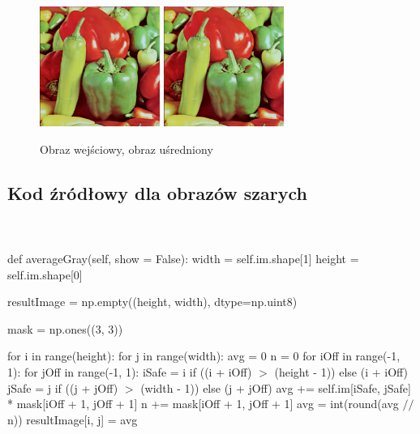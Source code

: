 \documentclass[final,a4paper,openany,12pt]{mwbk}
\begin{document}
\begin{figure}[H]
	\begin{center}
		\includegraphics[width=0.35\textwidth]{peppers_color}
		\includegraphics[width=0.35\textwidth]{peppers_color_lowpassAvg_result}
	\end{center}
	\caption{Obraz wejściowy, obraz uśredniony}
\end{figure}
\newpage

\subsection*{Kod źródłowy dla obrazów szarych}
\hfill
\\\\
\noindent def averageGray(self, show = False): \newline
\indent width = self.im.shape[1] \newline
\indent height = self.im.shape[0] \newline

resultImage = np.empty((height, width), dtype=np.uint8) \newline

mask = np.ones((3, 3)) \newline

for i in range(height): \newline
\indent for j in range(width): \newline
\indent avg = 0 \newline
\indent n = 0 \newline
\indent for iOff in range(-1, 1): \newline
\indent for jOff in range(-1, 1): \newline
\indent iSafe = i if ((i + iOff) $>$ (height - 1)) else (i + iOff) \newline
\indent jSafe = j if ((j + jOff) $>$ (width - 1)) else (j + jOff) \newline
\indent avg += self.im[iSafe, jSafe] * mask[iOff + 1, jOff + 1] \newline
\indent n += mask[iOff + 1, jOff + 1] \newline
\indent avg = int(round(avg $//$ n)) \newline
\indent resultImage[i, j] = avg \newline
\end{document}
